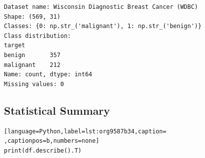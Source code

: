\documentclass[12pt,a4paper]{article}
\begin{document}
\begin{verbatim}
Dataset name: Wisconsin Diagnostic Breast Cancer (WDBC)
Shape: (569, 31)
Classes: {0: np.str_('malignant'), 1: np.str_('benign')}
Class distribution:
target
benign       357
malignant    212
Name: count, dtype: int64
Missing values: 0
\end{verbatim}

\subsection{Statistical Summary}
\label{sec:org9fba2b2}

\begin{lstlisting}[language=Python,label=lst:org9587b34,caption= ,captionpos=b,numbers=none]
print(df.describe().T)
\end{lstlisting}
\end{document}
